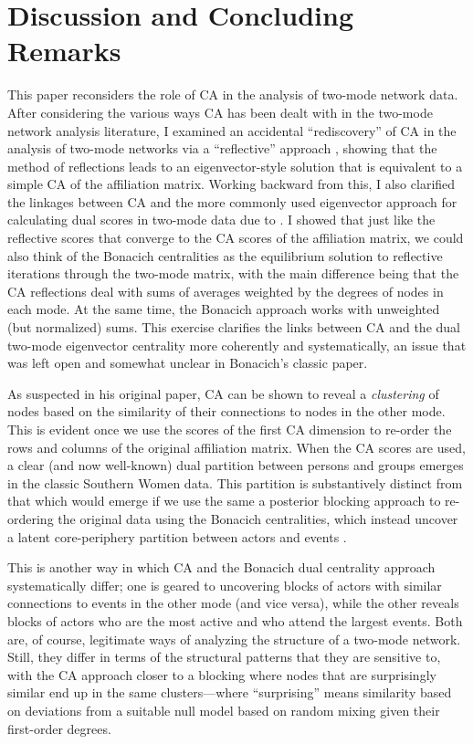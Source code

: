 \documentclass[a4paper,fleqn]{cas-sc}
\begin{document}
\section{Discussion and Concluding Remarks} \label{sec:disc}
This paper reconsiders the role of CA in the analysis of two-mode network data. After considering the various ways CA has been dealt with in the two-mode network analysis literature, I examined an accidental ``rediscovery'' of CA in the analysis of two-mode networks via a ``reflective'' approach \citep{hidalgo2009building}, showing that the method of reflections leads to an eigenvector-style solution that is equivalent to a simple CA of the affiliation matrix. Working backward from this, I also clarified the linkages between CA and the more commonly used eigenvector approach for calculating dual scores in two-mode data due to \citet{bonacich1991simultaneous}. I showed that just like the reflective scores that converge to the CA scores of the affiliation matrix, we could also think of the Bonacich centralities as the equilibrium solution to reflective iterations through the two-mode matrix, with the main difference being that the CA reflections deal with sums of averages weighted by the degrees of nodes in each mode. At the same time, the Bonacich approach works with unweighted (but normalized) sums. This exercise clarifies the links between CA and the dual two-mode eigenvector centrality more coherently and systematically, an issue that was left open and somewhat unclear in Bonacich's \citeyearpar{bonacich1991simultaneous} classic paper. 

As \citet{bonacich1991simultaneous} suspected in his original paper, CA can be shown to reveal a \textit{clustering} of nodes based on the similarity of their connections to nodes in the other mode. This is evident once we use the scores of the first CA dimension to re-order the rows and columns of the original affiliation matrix. When the CA scores are used, a clear (and now well-known) dual partition between persons and groups emerges in the classic Southern Women data. This partition is substantively distinct from that which would emerge if we use the same a posterior blocking approach to re-ordering the original data using the Bonacich centralities, which instead uncover a latent core-periphery partition between actors and events \citep{everett2013dual}. 

This is another way in which CA and the Bonacich dual centrality approach systematically differ; one is geared to uncovering blocks of actors with similar connections to events in the other mode (and vice versa), while the other reveals blocks of actors who are the most active and who attend the largest events. Both are, of course, legitimate ways of analyzing the structure of a two-mode network. Still, they differ in terms of the structural patterns that they are sensitive to, with the CA approach closer to a blocking where nodes that are surprisingly similar end up in the same clusters---where ``surprising'' means similarity based on deviations from a suitable null model based on random mixing given their first-order degrees. 
\end{document}
